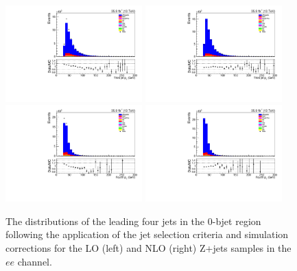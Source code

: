 \begin{figure}[tbp]
\includegraphics[width=0.47\textwidth]{figs/background-estimation/plots/unblinded/DY_control_old_prompt_ee_ttbarInc/thirdJetPt_SingleTop_jetSel_ee.pdf}
\includegraphics[width=0.47\textwidth]{figs/background-estimation/plots/unblinded/DY_control_old_prompt_ee_DYamcatnlo/thirdJetPt_SingleTop_jetSel_ee.pdf}
\\
\includegraphics[width=0.47\textwidth]{figs/background-estimation/plots/unblinded/DY_control_old_prompt_ee_ttbarInc/fourthJetPt_SingleTop_jetSel_ee.pdf}
\includegraphics[width=0.47\textwidth]{figs/background-estimation/plots/unblinded/DY_control_old_prompt_ee_DYamcatnlo/fourthJetPt_SingleTop_jetSel_ee.pdf}
\caption{
The distributions of the leading four jets \pt in the 0-bjet region following the application of the jet selection criteria and simulation corrections for the LO (left) and NLO (right) Z+jets samples in the $ee$ channel.
}
\label{fig:zPlusCR_jetPt}
\end{figure}


